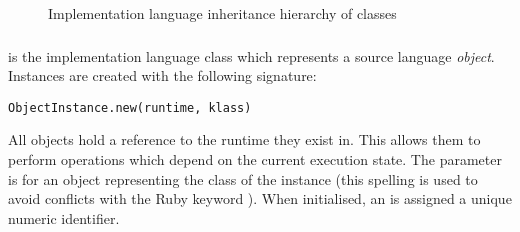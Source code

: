 \begin{figure}
\begin{center}
\caption{Implementation language inheritance hierarchy of  classes}
\label{fig:data_object_hierarchy}
\end{center}
\end{figure}

\newpage
\subsubsection{}

 is the implementation language class which represents a source language \textit{object}. Instances are created with the following signature:

\begin{lstlisting}
ObjectInstance.new(runtime, klass)
\end{lstlisting}

All  objects hold a reference to the runtime they exist in. This allows them to perform operations which depend on the current execution state. The  parameter is for an object representing the class of the instance (this spelling is used to avoid conflicts with the Ruby keyword ). When initialised, an  is assigned a unique numeric identifier.

